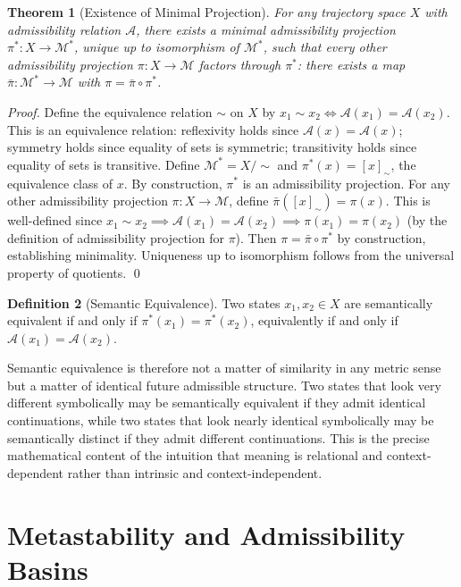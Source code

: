 \documentclass[12pt, a4paper, openany]{book}
\theoremstyle{plain}
\newtheorem{theorem}{Theorem}[chapter]
\theoremstyle{definition}
\newtheorem{definition}[theorem]{Definition}
\theoremstyle{remark}
\newcommand{\Adm}{\mathcal{A}}
\begin{document}
\begin{theorem}[Existence of Minimal Projection]
For any trajectory space $X$ with admissibility relation $\Adm$, there exists a minimal admissibility projection $\pi^*: X \to \mathcal{M}^*$, unique up to isomorphism of $\mathcal{M}^*$, such that every other admissibility projection $\pi: X \to \mathcal{M}$ factors through $\pi^*$: there exists a map $\bar\pi: \mathcal{M}^* \to \mathcal{M}$ with $\pi = \bar\pi \circ \pi^*$.
\end{theorem}

\begin{proof}
Define the equivalence relation $\sim$ on $X$ by $x_1 \sim x_2 \iff \Adm(x_1) = \Adm(x_2)$. This is an equivalence relation: reflexivity holds since $\Adm(x) = \Adm(x)$; symmetry holds since equality of sets is symmetric; transitivity holds since equality of sets is transitive. Define $\mathcal{M}^* = X / {\sim}$ and $\pi^*(x) = [x]_\sim$, the equivalence class of $x$. By construction, $\pi^*$ is an admissibility projection. For any other admissibility projection $\pi: X \to \mathcal{M}$, define $\bar\pi([x]_\sim) = \pi(x)$. This is well-defined since $x_1 \sim x_2 \implies \Adm(x_1) = \Adm(x_2) \implies \pi(x_1) = \pi(x_2)$ (by the definition of admissibility projection for $\pi$). Then $\pi = \bar\pi \circ \pi^*$ by construction, establishing minimality. Uniqueness up to isomorphism follows from the universal property of quotients. \qed
\end{proof}

\begin{definition}[Semantic Equivalence]
Two states $x_1, x_2 \in X$ are semantically equivalent if and only if $\pi^*(x_1) = \pi^*(x_2)$, equivalently if and only if $\Adm(x_1) = \Adm(x_2)$.
\end{definition}

Semantic equivalence is therefore not a matter of similarity in any metric sense but a matter of identical future admissible structure. Two states that look very different symbolically may be semantically equivalent if they admit identical continuations, while two states that look nearly identical symbolically may be semantically distinct if they admit different continuations. This is the precise mathematical content of the intuition that meaning is relational and context-dependent rather than intrinsic and context-independent.

\section{Metastability and Admissibility Basins}
\end{document}
